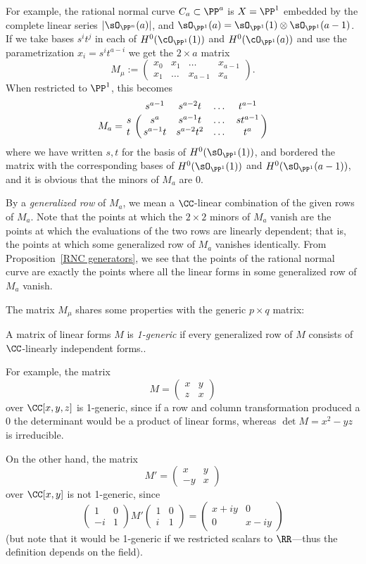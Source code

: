 For example, the rational normal curve $C_a\subset \PP^a$ is $X = \PP^1$ embedded by the complete
linear series $|\sO_{\PP^n}(a)|$, and $\sO_{\PP^1}(a) = \sO_{\PP^1}(1)\otimes \sO_{\PP^1}(a-1)$.
If we take bases $s^it^j$ in each of $H^0(\cO_{\PP^1}(1))$ and  $H^0(\cO_{\PP^1}(a))$ and use the parametrization
$x_i = s^it^{a-i}$ we get
the $2\times a$ matrix
$$
M_\mu := 
\begin{pmatrix}
x_0&x_1&\dots&x_{a-1}\\
x_1&\dots&x_{a-1}&x_a
\end{pmatrix}.
$$
When restricted to $\PP^1$, this becomes
$$
M_a = \bordermatrix{
& s^{a-1}&s^{a-2}t&\dots&t^{a-1}\cr
s&  s^{a}& s^{a-1}t&\dots&st^{a-1}\cr
t&  s^{a-1}t& s^{a-2}t^{2}&\dots&t^{a}\cr
}$$
where we have written $s,t$ for the basis of $H^0(\sO_{\PP^1}(1))$, and bordered the matrix
with the corresponding bases of $H^0(\sO_{\PP^1}(1))$ and $H^0(\sO_{\PP^1}(a-1))$, and it is obvious
that the minors of $M_a$ are 0.

By a \emph{generalized row} of $M_{a}$, we mean a $\CC$-linear combination of the given rows of $M_{a}$. Note that the points at which the $2\times 2$ minors of $M_{a}$ vanish are the points at which the evaluations of the two rows are linearly dependent; that is, the points at which some
generalized row of $M_{a}$ vanishes identically. From Proposition~\ref{RNC generators}, we see that the points of the rational normal curve are exactly the points where all the linear forms in some generalized row
of $M_{a}$ vanish.


The matrix $M_{\mu}$ shares some properties with the generic $p\times q$ matrix:

\begin{definition}
 A matrix of linear forms $M$ is  \emph{1-generic} if every generalized row of $M$
 consists of $\CC$-linearly independent forms.. 
 \end{definition}

 For example, the matrix 
$$
M = \begin{pmatrix}
 x &y\\
 z&x
\end{pmatrix}
$$
over $\CC[x,y,z]$ is  1-generic, since if a row and column transformation produced a 0 the determinant would be a product of linear forms, whereas
$\det M = x^2-yz$ is irreducible. 

On the other hand, the matrix
$$
M' = \begin{pmatrix}
 x &y\\
 -y&x
\end{pmatrix}
$$
over $\CC[x,y]$ is not 1-generic, since
$$
\begin{pmatrix}
1&0\\
-i&1 
\end{pmatrix}
M'
\begin{pmatrix}
 1&0\\
 i&1
\end{pmatrix}
= 
\begin{pmatrix}
 x+iy&0\\
 0&x-iy
\end{pmatrix}
$$
(but note that it would be 1-generic if we restricted scalars to $\RR$---thus the definition depends on the field).

